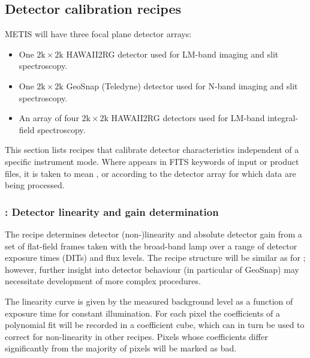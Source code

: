 \subsection{Detector calibration recipes}
\label{Sec:detector_calibration}

METIS will have three focal plane detector arrays:
\begin{itemize}
\item One $2\mathrm{k}\times 2\mathrm{k}$ HAWAII2RG detector used for
  LM-band imaging and slit spectroscopy.
\item One $2\mathrm{k}\times 2\mathrm{k}$ GeoSnap (Teledyne) detector
  used for N-band imaging and slit spectroscopy.
\item An array of four $2\mathrm{k}\times 2\mathrm{k}$ HAWAII2RG
  detectors used for LM-band integral-field spectroscopy.
\end{itemize}
This section lists recipes that calibrate detector characteristics
independent of a specific instrument mode. Where  appears
in FITS keywords of input or product files, it is taken to mean
,  or  according to the detector
array for which data are being processed.
\subsubsection{: Detector linearity and gain determination}
\label{sssec:metis_det_lingain}
\label{rec:metis_det_lingain}
\label{rec:metisdetlingain}

The recipe  determines detector (non-)linearity and absolute detector
gain from a set of flat-field frames taken with the broad-band lamp
over a range of detector exposure times (DITs) and flux levels. The
recipe structure will be similar as for  %
\cite{detmon-manual}; however, further insight into detector behaviour
(in particular of GeoSnap) may necessitate development of more complex
procedures.

The linearity curve is given by the measured background level as a
function of exposure time for constant illumination. For each pixel
the coefficients of a polynomial fit will be recorded in a
coefficient cube, which can in turn be used to correct for
non-linearity in other recipes. Pixels whose coefficients differ
significantly from the majority of pixels will be marked as bad.

